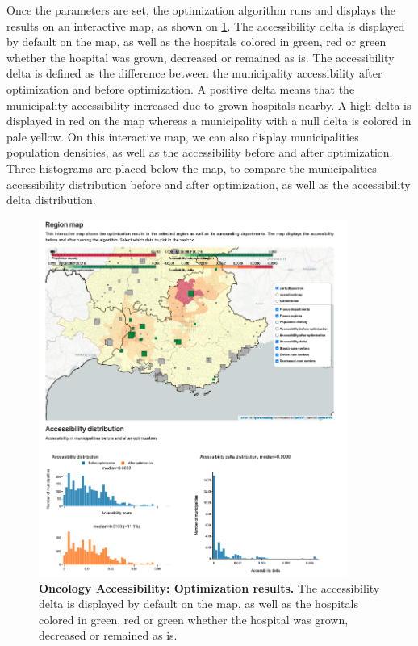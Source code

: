 Once the parameters are set, the optimization algorithm runs and displays the
results on an interactive map, as shown on \cref{fig:optim-results}. The
accessibility delta is displayed by default on the map, as well as the hospitals
colored in green, red or green whether the hospital was grown, decreased or
remained as is. The accessibility delta is defined as the difference between the
municipality accessibility after optimization and before optimization. A
positive delta means that the municipality accessibility increased due to grown
hospitals nearby. A high delta is displayed in red on the map whereas a
municipality with a null delta is colored in pale yellow. On this interactive
map, we can also display municipalities population densities, as well as the
accessibility before and after optimization. Three histograms are placed below
the map, to compare the municipalities accessibility distribution before and
after optimization, as well as the accessibility delta distribution.

\begin{figure}[H]
    \includegraphics[width=0.9\textwidth]{images/oncology-accessibility/optim-paca-map.png}
    \centering
    \caption{ \textbf{Oncology Accessibility: Optimization results.}  The
        accessibility delta is displayed by default on the map, as well as the
        hospitals colored in green, red or green whether the hospital was grown,
        decreased or remained as is. }
    \label{fig:optim-results}
\end{figure}

